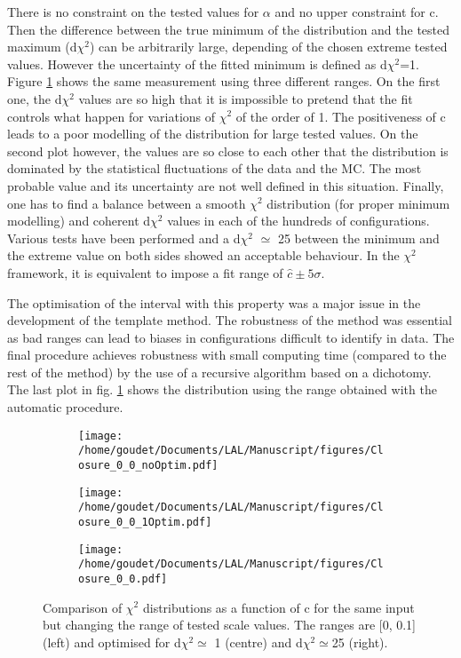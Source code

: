 There is no constraint on the tested values for \(\alpha\) and no upper constraint for c.
Then the difference between the true minimum of the distribution and the tested maximum (d$\chi^2$) can be arbitrarily large, depending of the chosen extreme tested values.
However the uncertainty of the fitted minimum is defined  as d$\chi^2$=1.
Figure \ref{org010bed5} shows the same measurement using three different ranges.
On the first one, the d$\chi^2$ values are so high that it is impossible to pretend that the fit controls what happen for variations of $\chi^2$ of the order of 1.
The positiveness of c leads to a poor modelling of the distribution for large tested values.
On the second plot however, the values are so close to each other that the distribution is dominated by the statistical fluctuations of the data and the MC.
The most probable value and its uncertainty are not well defined in this situation.
Finally, one has to find a balance between a smooth $\chi^2$ distribution (for proper minimum modelling) and coherent d$\chi^2$ values in each of the hundreds of configurations.
Various tests have been performed and a d$\chi^2$ \(\simeq\) 25 between the minimum and the extreme value on both sides showed an acceptable behaviour.
In the $\chi^2$ framework, it is equivalent to impose a fit range of $\hat{c}\pm 5\sigma$.

The optimisation of the interval with this property was a major issue in the development of the template method.
The robustness of the method was essential as bad ranges can lead to biases in configurations difficult to identify in data.
The final procedure achieves robustness with small computing time (compared to the rest of the method) by the use of a recursive algorithm based on a dichotomy.
The last plot in fig. \ref{org010bed5} shows the distribution using the range obtained with the automatic procedure.

\begin{figure}
\begin{subfigure}[t]{0.32\linewidth}
\begin{center}
\texttt{[image: /home/goudet/Documents/LAL/Manuscript/figures/Closure\_0\_0\_noOptim.pdf]}
\end{center}
\end{subfigure}
\begin{subfigure}[t]{0.32\linewidth}
\begin{center}
\texttt{[image: /home/goudet/Documents/LAL/Manuscript/figures/Closure\_0\_0\_1Optim.pdf]}
\end{center}
\end{subfigure}
\begin{subfigure}[t]{0.32\linewidth}
\begin{center}
\texttt{[image: /home/goudet/Documents/LAL/Manuscript/figures/Closure\_0\_0.pdf]}
\end{center}
\end{subfigure}
\caption{\label{org010bed5}
Comparison of $\chi^2$ distributions as a function of c for the same input but changing the range of tested scale values. The ranges are [0, 0.1] (left) and optimised for d\(\chi^{\text{2}} \simeq\) 1 (centre) and d\(\chi^{\text{2}} \simeq\)25 (right).}
\end{figure}


